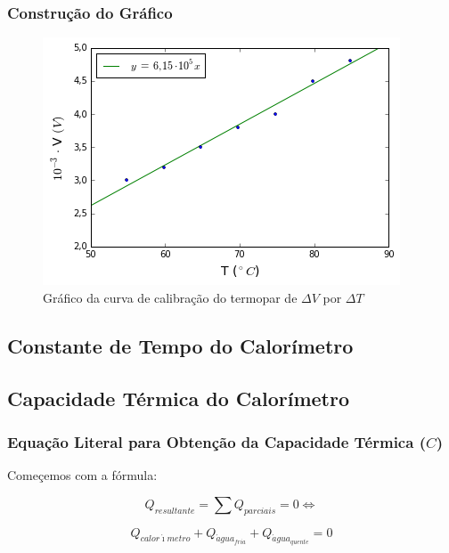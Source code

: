 \documentclass[a4paper]{article}
\begin{document}
			\subsubsection{Construção do Gráfico}

			\begin{figure}[!ht]
					\begin{centering}
						\includegraphics[scale=0.745]{exp06a-parte1.png}
					\par\end{centering}
				\caption{Gráfico da curva de calibração do termopar de $\Delta V$ por $\Delta T$}
			\end{figure}

	\subsection{Constante de Tempo do Calorímetro}

	\subsection{Capacidade Térmica do Calorímetro}


		\subsubsection{Equação Literal para Obtenção da Capacidade Térmica ($C$)}

			Começemos com a fórmula:

			$$Q_{resultante}={\displaystyle \sum Q_{parciais}=0}\Leftrightarrow$$


			\begin{equation}
				Q_{calor\acute{\imath}metro}+Q_{\acute{a}gua_{fria}}+Q_{\acute{a}gua_{quente}}=0
			\end{equation}
\end{document}
